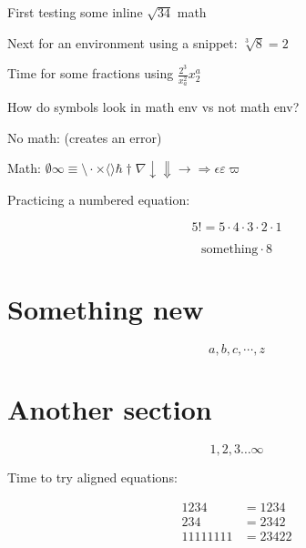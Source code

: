 \documentclass{article}
\begin{document}

First testing some inline $\sqrt{34}$ math 

Next for an environment using a snippet: $\sqrt[3]{8}=2$

Time for some fractions using $\frac{2^3}{x_a^2}x^a_2$  

How do symbols look in math env vs not math env?

No math: (creates an error)

Math: $\emptyset \infty \equiv \setminus \cdot \times \langle \rangle \hbar \dagger \nabla \downarrow \Downarrow \rightarrow \Rightarrow \epsilon \varepsilon \varpi$

Practicing a numbered equation:

\begin{equation}
5! = 5 \cdot 4 \cdot 3 \cdot 2 \cdot 1
\end{equation}

\begin{equation*}
\text{something} \cdot 8
\end{equation*}

\section{Something new}

\begin{equation}
a, b, c, \cdots, z
\end{equation}

\section{Another section}

\begin{equation}
1, 2, 3 \dotsc  \infty
\end{equation}

Time to try aligned equations:

\begin{align*}
    1234 &= 1234 \\
    234 &= 2342 \\
    11111111 &= 23422
\end{align*}

\end{document}
